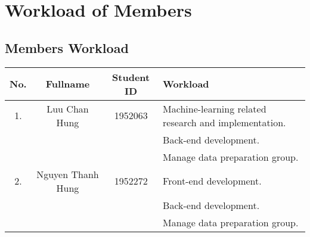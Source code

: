 \chapter{Workload of Members}
\section{Members Workload}
\begin{center}
\begin{tabular}{|c|c|c|p{5cm}|}
\hline
\textbf{No.} & \textbf{Fullname} & \textbf{Student ID} & \textbf{Workload} \\
\hline 
1. & Luu Chan Hung & 1952063 & Machine-learning related research and implementation. \\
&  &  & Back-end development. \\
& & & Manage data preparation group.\\
\hline 
2. & Nguyen Thanh Hung & 1952272 & Front-end development. \\
&  &  & Back-end development. \\
& & & Manage data preparation group.\\
\hline 
\end{tabular}
\end{center}